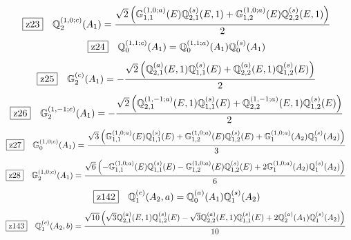 \documentclass[fleqn,10pt,landscape]{jsarticle}
\begin{document}
\begin{dmath*}
\hspace*{3mm}\fbox{z23}\quad \mathbb{Q}_{2}^{(1,0;c)}(A_{1})=\frac{\sqrt{2} \left(\mathbb{G}_{1,1}^{(1,0;a)}(E) \mathbb{Q}_{2,1}^{(s)}(E,1) + \mathbb{G}_{1,2}^{(1,0;a)}(E) \mathbb{Q}_{2,2}^{(s)}(E,1)\right)}{2}
\end{dmath*}
\begin{dmath*}
\hspace*{3mm}\fbox{z24}\quad \mathbb{Q}_{0}^{(1,1;c)}(A_{1})=\mathbb{Q}_{0}^{(1,1;a)}(A_{1}) \mathbb{Q}_{0}^{(s)}(A_{1})
\end{dmath*}
\begin{dmath*}
\hspace*{3mm}\fbox{z25}\quad \mathbb{G}_{2}^{(c)}(A_{1})=- \frac{\sqrt{2} \left(\mathbb{Q}_{2,1}^{(a)}(E,1) \mathbb{Q}_{1,1}^{(s)}(E) + \mathbb{Q}_{2,2}^{(a)}(E,1) \mathbb{Q}_{1,2}^{(s)}(E)\right)}{2}
\end{dmath*}
\begin{dmath*}
\hspace*{3mm}\fbox{z26}\quad \mathbb{G}_{2}^{(1,-1;c)}(A_{1})=- \frac{\sqrt{2} \left(\mathbb{Q}_{2,1}^{(1,-1;a)}(E,1) \mathbb{Q}_{1,1}^{(s)}(E) + \mathbb{Q}_{2,2}^{(1,-1;a)}(E,1) \mathbb{Q}_{1,2}^{(s)}(E)\right)}{2}
\end{dmath*}
\begin{dmath*}
\hspace*{3mm}\fbox{z27}\quad \mathbb{G}_{0}^{(1,0;c)}(A_{1})=\frac{\sqrt{3} \left(\mathbb{G}_{1,1}^{(1,0;a)}(E) \mathbb{Q}_{1,1}^{(s)}(E) + \mathbb{G}_{1,2}^{(1,0;a)}(E) \mathbb{Q}_{1,2}^{(s)}(E) + \mathbb{G}_{1}^{(1,0;a)}(A_{2}) \mathbb{Q}_{1}^{(s)}(A_{2})\right)}{3}
\end{dmath*}
\begin{dmath*}
\hspace*{3mm}\fbox{z28}\quad \mathbb{G}_{2}^{(1,0;c)}(A_{1})=\frac{\sqrt{6} \left(- \mathbb{G}_{1,1}^{(1,0;a)}(E) \mathbb{Q}_{1,1}^{(s)}(E) - \mathbb{G}_{1,2}^{(1,0;a)}(E) \mathbb{Q}_{1,2}^{(s)}(E) + 2 \mathbb{G}_{1}^{(1,0;a)}(A_{2}) \mathbb{Q}_{1}^{(s)}(A_{2})\right)}{6}
\end{dmath*}
\begin{dmath*}
\hspace*{3mm}\fbox{z142}\quad \mathbb{Q}_{1}^{(c)}(A_{2},a)=\mathbb{Q}_{0}^{(a)}(A_{1}) \mathbb{Q}_{1}^{(s)}(A_{2})
\end{dmath*}
\begin{dmath*}
\hspace*{3mm}\fbox{z143}\quad \mathbb{Q}_{1}^{(c)}(A_{2},b)=\frac{\sqrt{10} \left(\sqrt{3} \mathbb{Q}_{2,1}^{(a)}(E,1) \mathbb{Q}_{1,2}^{(s)}(E) - \sqrt{3} \mathbb{Q}_{2,2}^{(a)}(E,1) \mathbb{Q}_{1,1}^{(s)}(E) + 2 \mathbb{Q}_{2}^{(a)}(A_{1}) \mathbb{Q}_{1}^{(s)}(A_{2})\right)}{10}
\end{dmath*}
\end{document}
